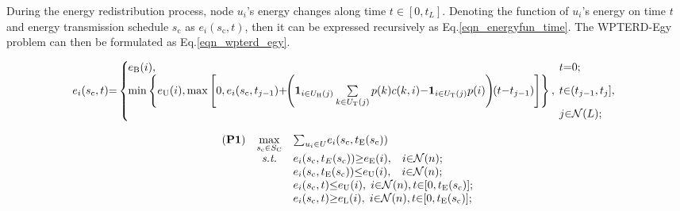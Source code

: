\documentclass[journal,10pt]{IEEEtran}
\begin{document}
During the energy redistribution process, node $u_i$'s energy changes along time $t{\in}[0,t_{L}]$. Denoting the function of $u_i$'s energy on time $t$ and energy transmission schedule $s_\text{c}$ as $e_i(s_\text{c},t)$, then it can be expressed recursively as Eq.\eqref{eqn_energyfun_time}. The WPTERD-Egy problem can then be formulated as Eq.\eqref{eqn_wpterd_egy}.


\begin{figure}
\begin{equation}
\label{eqn_energyfun_time}
e_i(s_\text{c},t){=}\left\{
\begin{array}{ll}
\hspace{-2mm}e_\text{B}(i), \hspace{2mm}&\hspace{-2mm}t{=}0;\\
\hspace{-2mm}\min\left\{e_\text{U}(i),
\max\left[0,
e_i(s_\text{c},t_{j{-}1})
{+}\hspace{-1mm}\left(
\mathbf{1}_{i{\in}U_\text{H}(j)}
\mathop{\sum}\limits_{k{\in}U_\text{T}(j)}p(k)c(k,i)
{-}
\mathbf{1}_{i{\in}U_\text{T}(j)}p(i)
\right)
\hspace{-1mm}(t{-}t_{j{-}1})
\right]
\right\}
,&\hspace{-2mm}t{\in}(t_{j{-}1},t_j],\\
&\hspace{-2mm}j{\in}\mathcal{N}(L);
\end{array}
\right.
\end{equation}
\end{figure}


\begin{equation}
\label{eqn_wpterd_egy}
\begin{array}{rcl}
(\textbf{P1})&\mathop{\max}\limits_{s_\text{c}{\in}S_\text{C}}&{\sum}_{u_i{\in}U}e_i(s_\text{c},t_\text{E}(s_\text{c}))\\
&\textit{s.t.}&e_i(s_\text{c},t_E(s_\text{c})){\geq}e_\text{E}(i),\hspace{3mm}i{\in}\mathcal{N}(n);\\
&&e_i(s_\text{c},t_\text{E}(s_\text{c})){\leq}e_\text{U}(i),\hspace{3mm}i{\in}\mathcal{N}(n);\\
&&e_i(s_\text{c},t){\leq}e_\text{U}(i),\hspace{1mm}i{\in}\mathcal{N}(n),t{\in}[0,t_\text{E}(s_\text{c})];\\
&&e_i(s_\text{c},t){\geq}e_\text{L}(i),\hspace{1mm}i{\in}\mathcal{N}(n),t{\in}[0,t_\text{E}(s_\text{c})];
\end{array}
\end{equation}
\end{document}
